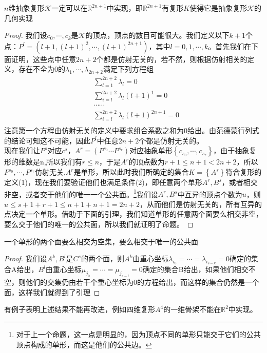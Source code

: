\begin{proposition}
$n$维抽象复形$\mathcal{K}$一定可以在$\mathbb{R}^{2n+1}$中实现，即$\mathbb{R}^{2n+1}$有复形$K$使得它是抽象复形$\mathcal{K}$的几何实现
\end{proposition}
\begin{proof}
我们设$c_{0},\cdots,c_{k}$是$\mathcal{K}$的顶点，顶点的数目可能很大。我们定义以下$k+1$个点：$P^{l}=(l+1,(l+1)^{2},\cdots,(l+1)^{2n+1})$，其中$l=0,1,\cdots,k$。首先我们在下面证明，这些点中任意$2n+2$个都是仿射无关的，若不然，则根据仿射相关的定义，存在不全为0的$\lambda_{1},\cdots,\lambda_{2n+2}$满足下列方程组
\begin{equation*}
    \begin{aligned}
    &\sum\limits_{l=1}^{2n+2}\lambda_{l}=0\\
    &\sum\limits_{i=l}^{2n+2}\lambda_{l}(l+1)^{1}=0\\
    &\cdots \cdots\\
    &\sum\limits_{i=l}^{2n+2}\lambda_{l}(l+1)^{2n+1}=0\\
    \end{aligned}
\end{equation*}
注意第一个方程由仿射无关的定义中要求组合系数之和为0给出。由范德蒙行列式的结论可知这不可能，因此$P^{l}$中任意$2n+2$个都是仿射无关的。\\
现在我们让$P^{s}$对应$c^{s}$，$A^{r}=(P^{s_{0}}\cdots P^{s_{r}})$对应抽象单形$\left\{c_{s_{0}},\cdots,c_{s_{r}}\right\}$，由于抽象复形的维数是n,所以我们有$r\leq n$，于是$A^{r}$的顶点数为$r+1\leq n+1<2n+2$，所以$P^{s_{0}},\cdots ,P^{s_{r}}$仿射无关,$A^{r}$是单形，所以此时我们所确定的集合$K=\left\{A^{s}\right\}$符合复形的定义(1)，现在我们要验证他们也满足条件(2)，即任意两个单形$A^{r},B^{s}$，或者相交非空，或者交于他们的唯一一个公共面。\footnote{对于上一个命题，这一点是明显的，因为顶点不同的单形只能交于它们的公共顶点构成的单形，而这是他们的公共边。}我们设$A^{r},B^{s}$中互异的顶点个数为$u$，则$u\leq s+1+r+1\leq n+1+n+1=2n+2$，从而他们是仿射无关的，所有互异的点决定一个单形。借助于下面的引理，我们知道单形的任意两个面要么相交非空，要么交于他们的唯一的公共面，所以我们就证明了命题。
\end{proof}
\begin{lemma}
一个单形的两个面要么相交为空集，要么相交于唯一的公共面
\end{lemma}
\begin{proof}
我们设$A^{k},B^{l}$是$C^{s}$的两个面，则$A^{k}$由重心坐标$\lambda_{i_{0}}=\cdots=\lambda_{i_{s-k}}=0$确定的集合A给出，$B^{l}$由重心坐标$\mu_{j_{0}}=\cdots=\mu_{j_{s-l}}=0$确定的集合B给出，如果他们相交不空，则他们的交集仍由若干个重心坐标为0的方程给出，而这样的集合仍然是一个面，这样我们就得到了引理
\end{proof}
有例子表明上述结果不能再改进，例如四维复形$A^{4}$的一维骨架不能在$\mathbb{R}^{2}$中实现。

